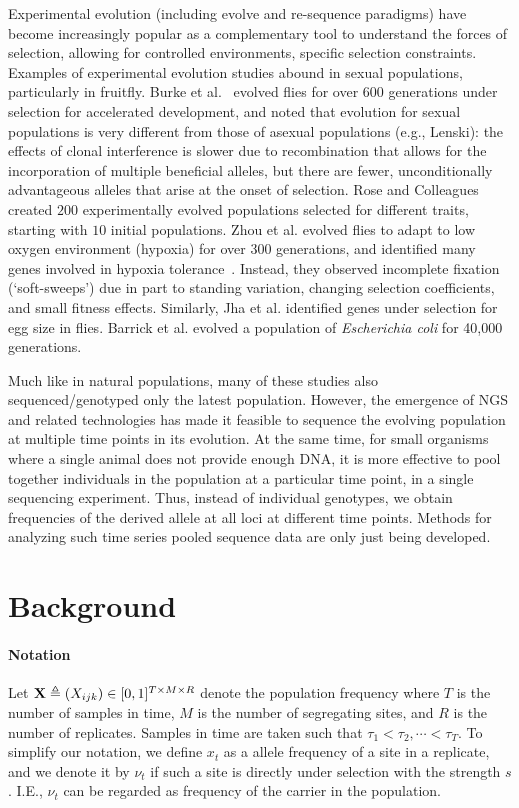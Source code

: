 \documentclass[11pt]{article}
\begin{document}
Experimental evolution (including evolve and re-sequence paradigms)
have become increasingly popular as a complementary tool to understand
the forces of selection, allowing for controlled environments,
specific selection constraints. Examples of experimental evolution
studies abound in sexual populations, particularly in fruitfly. Burke
et al.~\cite{Barrick2013Genome} evolved flies for over $600$ generations 
under
selection for accelerated development, and noted that evolution for
sexual populations is very different from those of asexual populations
(e.g., Lenski): the effects of clonal interference is slower
due to recombination that allows for the incorporation of multiple
beneficial alleles, but there are fewer, unconditionally advantageous
alleles that arise at the onset of selection. Rose and
Colleagues~\cite{rose1994evolutionary} created $200$ experimentally evolved
populations selected for different traits, starting with $10$ initial
populations. Zhou et al. evolved flies to adapt to low oxygen
environment (hypoxia) for over $300$ generations, and identified many
genes involved in hypoxia tolerance~\cite{zhou2011experimental}.  Instead, 
they observed
incomplete fixation (`soft-sweeps') due in part to standing variation,
changing selection coefficients, and small fitness effects. Similarly, Jha et
 al. \cite{jha2015whole} identified genes under selection for egg size in flies.
Barrick et al. \cite{barrick2009genome} evolved a population of 
\emph{Escherichia coli} for 40,000 generations.

Much like in natural populations, many of these studies also
sequenced/genotyped only the latest population. However, the emergence
of NGS and related technologies has made it feasible to sequence the
evolving population at multiple time points in its evolution. At the
same time, for small organisms where a single animal does not provide
enough DNA, it is more effective to pool together individuals in the
population at a particular time point, in a single sequencing
experiment. Thus, instead of individual genotypes, we obtain
frequencies of the derived allele at all loci at different time
points. Methods for analyzing such time series pooled sequence data
are only just being developed.


\section{Background}
\paragraph{Notation} Let ${\mathbf X} \triangleq (X_{ijk}) \in [0, 1]^{T \times 
M\times R}$ denote the population frequency where $T$ is the number of samples 
in time, $M$ is the number of segregating sites, and $R$ is the number of 
replicates. Samples in time are taken such that $\tau_1<\tau_2,\cdots<\tau_T$.
To simplify our notation, we define $x_t$ as a allele frequency of a site in a
 replicate, and we denote it by $\nu_t$ if such a site is directly under 
 selection with the strength $s$. I.E., $\nu_t$ can be regarded as frequency of 
 the carrier in the  population.
\end{document}
